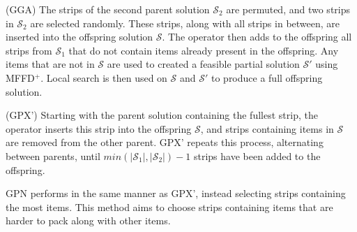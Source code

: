 \documentclass{elsarticle}
\begin{document}
(GGA) The strips of the second parent solution $\mathcal{S}_2$ are permuted, and two strips in $\mathcal{S}_2$ are selected randomly. These strips, along with all strips in between, are inserted into the offspring solution $\mathcal{S}$. The operator then adds to the offspring all strips from $\mathcal{S}_1$ that do not contain items already present in the offspring. Any items that are not in $\mathcal{S}$ are used to created a feasible partial solution $\mathcal{S}'$ using MFFD$^+$. Local search is then used on $\mathcal{S}$ and $\mathcal{S}'$ to produce a full offspring solution.

(GPX') Starting with the parent solution containing the fullest strip, the operator inserts this strip into the offspring $\mathcal{S}$, and strips containing items in $\mathcal{S}$ are removed from the other parent. GPX' repeats this process, alternating between parents, until $min (|\mathcal{S}_1|,|\mathcal{S}_2|) - 1$ strips have been added to the offspring.

GPN performs in the same manner as GPX', instead selecting strips containing the most items. This method aims to choose strips containing items that are harder to pack along with other items.
\end{document}
